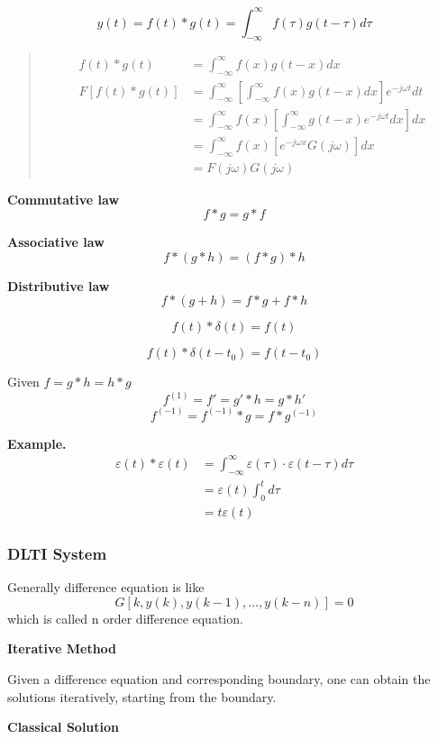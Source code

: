  \[ y(t) = f(t) * g(t) = \int_{-\infty}^\infty f(\tau)g(t-\tau)d\tau \]
 \begin{quote}
  \begin{align*}
   f(t) * g(t) &= \int_{-\infty}^\infty f(x)g(t-x)dx \\
  \mathit{F}[f(t)*g(t)] &= \int_{-\infty}^\infty [ \int_{-\infty}^\infty f(x)g(t-x)dx ] e^{-j\omega t} dt \\
               &= \int_{-\infty}^\infty f(x) [ \int_{-\infty}^\infty g(t-x) e^{-j\omega t} dx ] dx \\
               &= \int_{-\infty}^\infty f(x) [ e^{-j\omega x} G(j\omega) ] dx \\
               &= F(j\omega) G(j\omega)
  \end{align*}
 \end{quote}

 {\bf Commutative law}
 \[ f * g = g * f \]

 {\bf Associative law}
 \[ f * (g * h) = (f * g) * h\]

 {\bf Distributive law}
 \[ f * (g + h) = f * g + f * h\]

 \[ f(t) * \delta(t) = f(t)\]

 \[ f(t) * \delta(t - t_0) = f(t-t_0) \]

 Given $f = g * h = h * g$
 \[ f^{(1)} = f' = g' * h = g * h' \]
 \[ f^{(-1)} = f^{(-1)} * g = f * g^{(-1)}\]

 {\bf Example.}\\
 \begin{align*}
	 \varepsilon(t) * \varepsilon(t) &= \int^\infty_{-\infty} \varepsilon(\tau)\cdot\varepsilon(t-\tau)d\tau \\
	 &= \varepsilon(t) \int_0^t d\tau \\
	&= t \varepsilon(t)
 \end{align*}

 \subsubsection{DLTI System}

 Generally difference equation is like
 \[ G[k,y(k),y(k-1),\ldots,y(k-n)] = 0 \]
 which is called n order difference equation.

 {\bf Iterative Method}
 
 Given a difference equation and corresponding boundary,
 one can obtain the solutions iteratively, starting from
 the boundary.

 {\bf Classical Solution}

